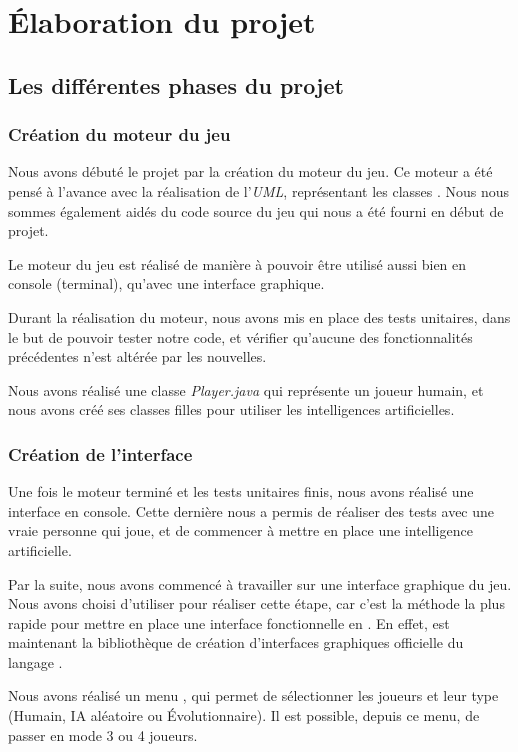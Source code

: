 \section{Élaboration du projet}

\subsection{Les différentes phases du projet}
\subsubsection{Création du moteur du jeu}

Nous avons débuté le projet par la création du moteur du jeu.
Ce moteur a été pensé à l'avance avec la réalisation de l'\emph{UML},
représentant les classes \java.
Nous nous sommes également aidés du code source du jeu qui nous a été fourni
en début de projet.

Le moteur du jeu est réalisé de manière à pouvoir être utilisé aussi bien en
console (terminal), qu'avec une interface graphique.

Durant la réalisation du moteur, nous avons mis en place des tests unitaires,
dans le but de pouvoir tester notre code, et vérifier qu'aucune des
fonctionnalités précédentes n'est altérée par les nouvelles.

Nous avons réalisé une classe \emph{Player.java} qui représente un joueur humain,
et nous avons créé ses classes filles pour utiliser les intelligences artificielles.

\subsubsection{Création de l'interface}

Une fois le moteur terminé et les tests unitaires finis, nous avons réalisé une interface en console.
Cette dernière nous a permis de réaliser des tests avec une vraie personne qui joue, et de 
commencer à mettre en place une intelligence artificielle.

Par la suite, nous avons commencé à travailler sur une interface graphique
du jeu. Nous avons choisi d'utiliser \fx pour réaliser cette étape, car c'est
la méthode la plus rapide pour mettre en place une interface fonctionnelle en \java.
En effet, \fx est maintenant la bibliothèque de création d'interfaces graphiques officielle du langage \java.

Nous avons réalisé un menu , qui permet de sélectionner les joueurs et leur type (Humain, IA aléatoire ou Évolutionnaire). Il est possible, depuis ce menu, de passer en mode 3 ou 4 joueurs.

